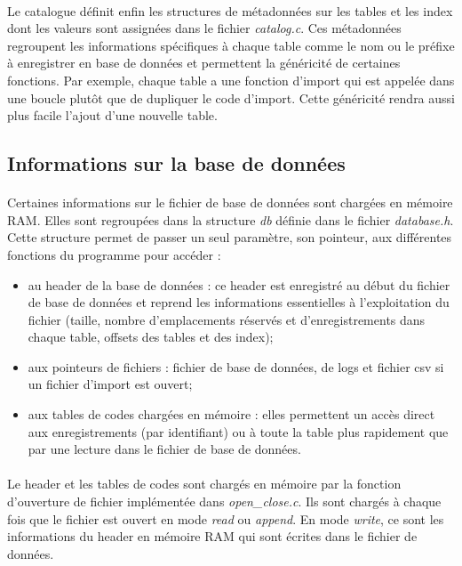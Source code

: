 \documentclass{article}
\begin{document}
    \paragraph{}
    Le catalogue définit enfin les structures de métadonnées sur les tables et les index dont les valeurs sont assignées dans le fichier \emph{catalog.c}. Ces métadonnées regroupent les informations spécifiques à chaque table comme le nom ou le préfixe à enregistrer en base de données et permettent la généricité de certaines fonctions. Par exemple, chaque table a une fonction d'import qui est appelée dans une boucle plutôt que de dupliquer le code d'import. Cette généricité rendra aussi plus facile l'ajout d'une nouvelle table.


    \subsection{Informations sur la base de données}
    \paragraph{}
    Certaines informations sur le fichier de base de données sont chargées en mémoire RAM. Elles sont regroupées dans la structure \emph{db} définie dans le fichier \emph{database.h}. Cette structure permet de passer un seul paramètre, son pointeur, aux différentes fonctions du programme pour accéder :
    \begin{itemize}[label=$\bullet$]
        \item au header de la base de données : ce header est enregistré au début du fichier de base de données et reprend les informations essentielles à l'exploitation du fichier (taille, nombre d'emplacements réservés et d'enregistrements dans chaque table, offsets des tables et des index);
        \item aux pointeurs de fichiers : fichier de base de données, de logs et fichier csv si un fichier d'import est ouvert;
        \item aux tables de codes chargées en mémoire : elles permettent un accès direct aux enregistrements (par identifiant) ou à toute la table plus rapidement que par une lecture dans le fichier de base de données.
    \end{itemize}

    \paragraph{}
    Le header et les tables de codes sont chargés en mémoire par la fonction d'ouverture de fichier implémentée dans \emph{open\_close.c}. Ils sont chargés à chaque fois que le fichier est ouvert en mode \emph{read} ou \emph{append}. En mode \emph{write}, ce sont les informations du header en mémoire RAM qui sont écrites dans le fichier de données.
\end{document}
